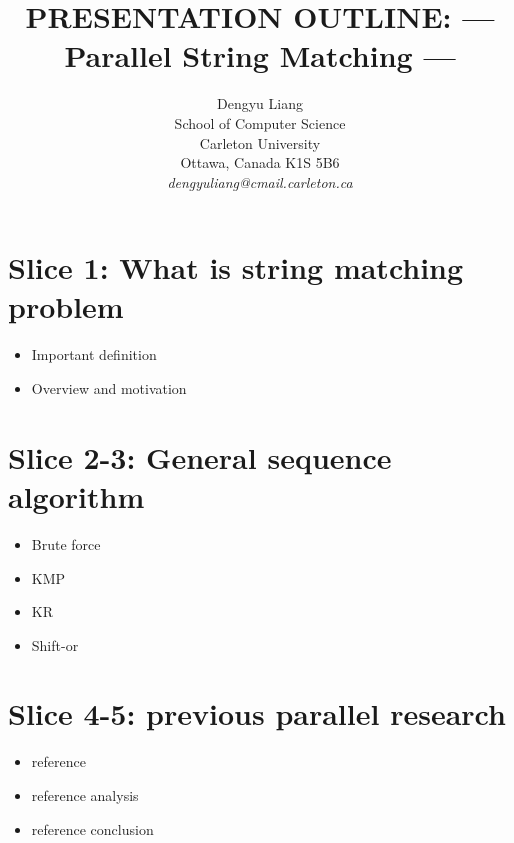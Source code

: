 \documentclass[11pt]{article}       %
\newenvironment{slide}[1]        {\section{#1} \begin{itemize}}%
                                 {\end{itemize}}
\begin{document}


\title{PRESENTATION OUTLINE: --- Parallel String Matching ---}


\author{
Dengyu Liang\\
School of Computer Science\\
Carleton University\\
Ottawa, Canada K1S 5B6\\
{\em dengyuliang@cmail.carleton.ca}
} %

\maketitle

\begin{slide}{Slice 1: What is string matching problem}
\item Important definition
\item Overview and motivation
\end{slide}


\begin{slide}{Slice 2-3: General sequence algorithm}
\item Brute force
\item KMP
\item KR
\item Shift-or
\end{slide}

\begin{slide}{Slice 4-5: previous parallel research}
\item reference
\item reference analysis
\item reference conclusion
\end{slide}
\end{document}
